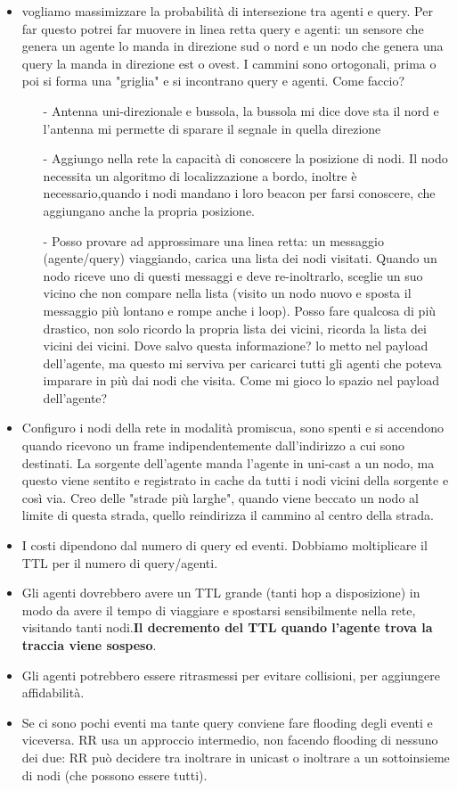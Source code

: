 \documentclass[12pt,italian]{report}
\begin{document}
\begin{itemize}
    \item vogliamo massimizzare la probabilità di intersezione tra agenti e query. Per far questo potrei far muovere in linea retta query e agenti: un sensore che genera un agente lo manda in direzione sud o nord e un nodo che genera una query la manda in direzione est o ovest. I cammini sono ortogonali, prima o poi si forma una "griglia" e si incontrano query e agenti. Come faccio?
    \begin{itemize}
        \item[-] Antenna uni-direzionale e bussola, la bussola mi dice dove sta il nord e l'antenna mi permette di sparare il segnale in quella direzione
        \item[-] Aggiungo nella rete la capacità di conoscere la posizione di nodi. Il nodo necessita un algoritmo di localizzazione a bordo, inoltre è necessario,quando i nodi mandano i loro beacon per farsi conoscere, che aggiungano anche la propria posizione. 
        \item[-] Posso provare ad approssimare una linea retta: un messaggio (agente/query) viaggiando, carica una lista dei nodi visitati. Quando un nodo riceve uno di questi messaggi e deve re-inoltrarlo, sceglie un suo vicino che non compare nella lista (visito un nodo nuovo e sposta il messaggio più lontano e rompe anche i loop). Posso fare qualcosa di più drastico, non solo ricordo la propria lista dei vicini, ricorda la lista dei vicini dei vicini. Dove salvo questa informazione? lo metto nel payload dell'agente, ma questo mi serviva per caricarci tutti gli agenti che poteva imparare in più dai nodi che visita. Come mi gioco lo spazio nel payload dell'agente?
    \end{itemize}
    \item Configuro i nodi della rete in modalità promiscua, sono spenti e si accendono quando ricevono un frame indipendentemente dall'indirizzo a cui sono destinati. La sorgente dell'agente manda l'agente in uni-cast a un nodo, ma questo viene sentito e registrato in cache da tutti i nodi vicini della sorgente e così via. Creo delle "strade più larghe", quando viene beccato un nodo al limite di questa strada, quello reindirizza il cammino al centro della strada. 
    \item I costi dipendono dal numero di query ed eventi. Dobbiamo moltiplicare il TTL per il numero di query/agenti.
    \item Gli agenti dovrebbero avere un TTL grande (tanti hop a disposizione) in modo da avere il tempo di viaggiare e spostarsi sensibilmente nella rete, visitando tanti nodi.\textbf{Il decremento del TTL quando l'agente trova la traccia viene sospeso}.
    \item Gli agenti potrebbero essere ritrasmessi per evitare collisioni, per aggiungere affidabilità. 
    \item Se ci sono pochi eventi ma tante query conviene fare flooding degli eventi e viceversa. RR usa un approccio intermedio, non facendo flooding di nessuno dei due: RR può decidere tra inoltrare in unicast o inoltrare a un sottoinsieme di nodi (che possono essere tutti).
\end{itemize}
\end{document}
